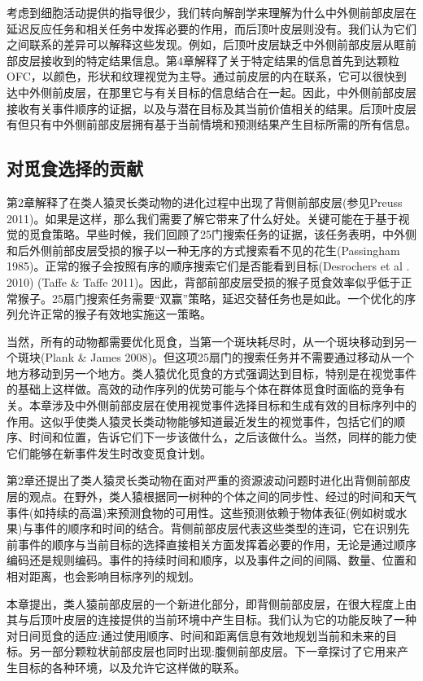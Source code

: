 考虑到细胞活动提供的指导很少，我们转向解剖学来理解为什么中外侧前部皮层在延迟反应任务和相关任务中发挥必要的作用，而后顶叶皮层则没有。我们认为它们之间联系的差异可以解释这些发现。例如，后顶叶皮层缺乏中外侧前部皮层从眶前部皮层接收到的特定结果信息。第4章解释了关于特定结果的信息首先到达颗粒OFC，以颜色，形状和纹理视觉为主导。通过前皮层的内在联系，它可以很快到达中外侧前皮层，在那里它与有关目标的信息结合在一起。因此，中外侧前部皮层接收有关事件顺序的证据，以及与潜在目标及其当前价值相关的结果。后顶叶皮层有但只有中外侧前部皮层拥有基于当前情境和预测结果产生目标所需的所有信息。

\subsection{对觅食选择的贡献}
第2章解释了在类人猿灵长类动物的进化过程中出现了背侧前部皮层(参见Preuss 2011)。如果是这样，那么我们需要了解它带来了什么好处。关键可能在于基于视觉的觅食策略。早些时候，我们回顾了25门搜索任务的证据，该任务表明，中外侧和后外侧前部皮层受损的猴子以一种无序的方式搜索看不见的花生(Passingham 1985)。正常的猴子会按照有序的顺序搜索它们是否能看到目标(Desrochers et al . 2010) (Taffe \& Taffe 2011)。因此，背部前部皮层受损的猴子觅食效率似乎低于正常猴子。25扇门搜索任务需要“双赢”策略，延迟交替任务也是如此。一个优化的序列允许正常的猴子有效地实施这一策略。

当然，所有的动物都需要优化觅食，当第一个斑块耗尽时，从一个斑块移动到另一个斑块(Plank \& James 2008)。但这项25扇门的搜索任务并不需要通过移动从一个地方移动到另一个地方。类人猿优化觅食的方式强调达到目标，特别是在视觉事件的基础上这样做。高效的动作序列的优势可能与个体在群体觅食时面临的竞争有关。本章涉及中外侧前部皮层在使用视觉事件选择目标和生成有效的目标序列中的作用。这似乎使类人猿灵长类动物能够知道最近发生的视觉事件，包括它们的顺序、时间和位置，告诉它们下一步该做什么，之后该做什么。当然，同样的能力使它们能够在新事件发生时改变觅食计划。

第2章还提出了类人猿灵长类动物在面对严重的资源波动问题时进化出背侧前部皮层的观点。在野外，类人猿根据同一树种的个体之间的同步性、经过的时间和天气事件(如持续的高温)来预测食物的可用性。这些预测依赖于物体表征(例如树或水果)与事件的顺序和时间的结合。背侧前部皮层代表这些类型的连词，它在识别先前事件的顺序与当前目标的选择直接相关方面发挥着必要的作用，无论是通过顺序编码还是规则编码。事件的持续时间和顺序，以及事件之间的间隔、数量、位置和相对距离，也会影响目标序列的规划。

本章提出，类人猿前部皮层的一个新进化部分，即背侧前部皮层，在很大程度上由其与后顶叶皮层的连接提供的当前环境中产生目标。我们认为它的功能反映了一种对日间觅食的适应:通过使用顺序、时间和距离信息有效地规划当前和未来的目标。另一部分颗粒状前部皮层也同时出现:腹侧前部皮层。下一章探讨了它用来产生目标的各种环境，以及允许它这样做的联系。